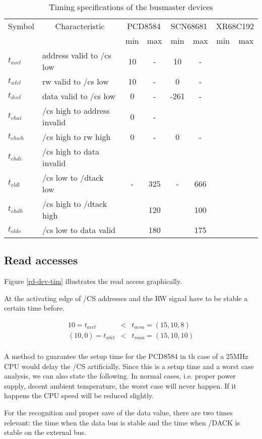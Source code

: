\documentclass[12pt]{article}
\newcommand{\btab}[1]{\begin{table}\begin{center}\begin{tabular}{#1}}
\newcommand{\etab}[2]{\end{tabular}\caption{\label{#1} #2}%
                      \end{center}\end{table}}
\newcommand{\beqn}{\begin{eqnarray*}}
\newcommand{\eeqn}{\end{eqnarray*}}
\begin{document}
\btab{|l|l||c|c||c|c||c|c|}
\hline
Symbol & \multicolumn{1}{c||}{Characteristic} & 
\multicolumn{2}{c||}{PCD8584} &
\multicolumn{2}{c||}{SCN68681} & \multicolumn{2}{c|}{XR68C192} \\
&& min & max & min & max & min & max \\ \hline\hline
$t_{avcl}$ & address valid to /cs low & 10 & - & 10 & - &&\\ \hline
$t_{wlcl}$ & rw valid to /cs low & 10 & - & 0 & - &&\\ \hline
$t_{dvcl}$ & data valid to /cs low & 0 & - & -261 & - &&\\ \hline
$t_{chai}$ & /cs high to address invalid & 0 & - &&&&\\ \hline
$t_{chwh}$ & /cs high to rw high & 0 & - & 0 & - &&\\ \hline
$t_{chdi}$ & /cs high to data invalid &&&&&& \\ \hline
$t_{cldl}$ & /cs low to /dtack low & - & 325 & - & 666 &&\\ \hline
$t_{chdh}$ & /cs high to /dtack high &  & 120 &  & 100 &&\\ \hline
$t_{cldv}$ & /cs low to data valid & & 180 & & 175 &&\\ \hline
\etab{dev-tim}{Timing specifications of the busmaster devices}


\subsection{Read accesses}

Figure \ref{rd-dev-tim} illustrates the read access graphically.

At the activating edge of /CS addresses and the RW signal have to be
stable a certain time before.

\beqn
10 = t_{avcl} &<& t_{avsa} = (15,10,8)\\
(10,0) = t_{wlcl} &<& t_{raaa} = (15,10,10)\\
\eeqn

A method to guarantee the setup time for the PCD8584 in th case of a
25MHz CPU
would delay the /CS artificially. Since this is a setup time and a
worst case analysis, we can also state the following. In normal cases,
i.e. proper power supply, decent ambient temperature, the worst case
will never happen. If it happens the CPU speed will be reduced
slightly.

For the recognition and proper save of the data value, there are two
times relevant: the time when the data bus is stable and the time when
/DACK is stable on the external bus.
\end{document}
